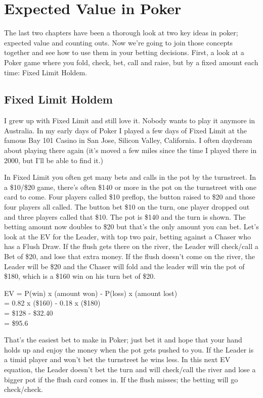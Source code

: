 \chapter{Expected Value in Poker}

The last two chapters have been a thorough look at two key ideas in
poker; expected value and counting outs. Now we're going to join
those concepts together and see how to use them in your betting
decisions. First, a look at a Poker game where you fold, check, bet,
call and raise, but by a fixed amount each time: Fixed Limit Holdem.

\section{Fixed Limit Holdem}

I grew up with Fixed Limit and still love it. Nobody wants to play it
anymore in Australia. In my early days of Poker I played a few days of
Fixed Limit at the famous Bay 101 Casino in San Jose, Silicon Valley,
California. I often daydream about playing there again (it's moved a
few miles since the time I played there in 2000, but I'll be able to
find it.)

In Fixed Limit you often get many bets and calls in the pot by the
turnstreet. In a \$10/\$20 game, there's often \$140 or more in the
pot on the turnstreet with one card to come. Four players called \$10
preflop, the button raised to \$20 and those four players all
called. The button bet \$10 on the turn, one player dropped out and
three players called that \$10. The pot is \$140 and the turn is
shown. The betting amount now doubles to \$20 but that's the only
amount you can bet. Let's look at the EV for the Leader, with top two
pair, betting against a Chaser who has a Flush Draw. If the flush gets
there on the river, the Leader will check/call a Bet of \$20, and lose
that extra money. If the flush doesn't come on the river, the Leader
will be \$20 and the Chaser will fold and the leader will win the pot
of \$180, which is a \$160 win on his turn bet of \$20.

EV = P(win) x (amount won) - P(loss) x (amount lost) \\
   = 0.82   x (\$160)      - 0.18    x (\$180) \\
   = \$128 - \$32.40 \\
   = \$95.6

That's the easiest bet to make in Poker; just bet it and hope that
your hand holds up and enjoy the money when the pot gets pushed to
you. If the Leader is a timid player and won't bet the turnstreet
he wins less. In this next EV equation, the Leader doesn't bet the
turn and will check/call the river and lose a bigger pot if the flush
card comes in. If the flush misses; the betting will go check/check.

